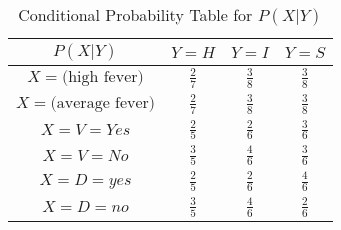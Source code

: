 \documentclass[a3paper,12pt]{article} %
\begin{document}
\begin{enumerate}
    \begin{table}[h]
    \centering
    \begin{tabular}{|c|c|c|c|}
    \hline
    \( P(X|Y) \) & \( Y = H \) & \( Y = I \) & \( Y = S \) \\
    \hline
    \( X = \text{(high fever)} \) & \(\frac{2}{7}\) & \(\frac{3}{8}\)  & \(\frac{3}{8}\) \\
    \( X = \text{(average fever)} \) & \(\frac{2}{7}\) & \(\frac{3}{8}\)  & \(\frac{3}{8}\) \\
    \( X = V = Yes \) &  \(\frac{2}{5}\) & \(\frac{2}{6}\) & \(\frac{3}{6}\) \\
    \( X = V = No \) &  \(\frac{3}{5}\) & \(\frac{4}{6}\) & \(\frac{3}{6}\) \\
    \( X = D = yes \) & \(\frac{2}{5}\)  & \(\frac{2}{6}\) & \(\frac{4}{6}\) \\
    \( X = D = no \) & \(\frac{3}{5}\)  & \(\frac{4}{6}\) & \(\frac{2}{6}\) \\
    \hline
    \end{tabular}
    \caption{Conditional Probability Table for \( P(X|Y) \)}
    \label{tab:conditional_probs}
    \end{table}


\end{enumerate}
\end{document}
